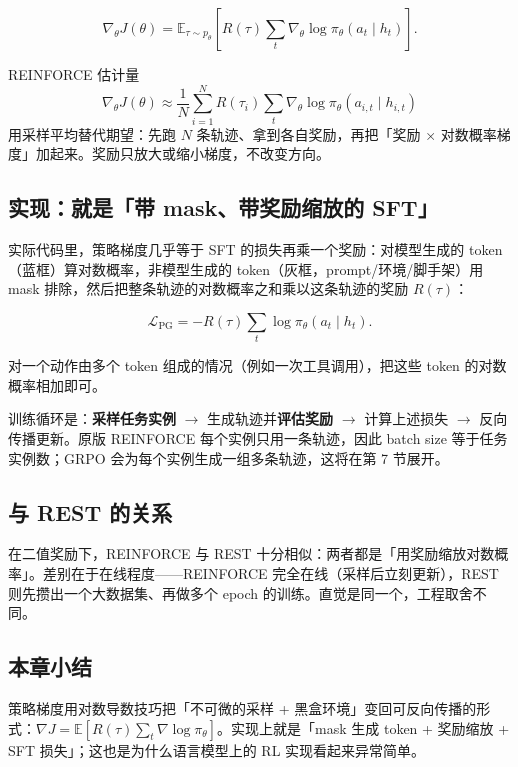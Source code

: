 \documentclass[a4paper]{article}
\begin{document}
$$
\nabla_\theta J(\theta) = \mathbb{E}_{\tau \sim p_\theta}\left[ R(\tau) \sum_{t} \nabla_\theta \log \pi_\theta(a_t \mid h_t) \right].
$$

\begin{importantbox}{REINFORCE 估计量}
\begin{displaymath}
\nabla_\theta J(\theta) \approx \frac{1}{N}\sum_{i=1}^{N} R(\tau_i) \sum_{t} \nabla_\theta \log \pi_\theta(a_{i,t} \mid h_{i,t})
\end{displaymath}
用采样平均替代期望：先跑 $N$ 条轨迹、拿到各自奖励，再把「奖励 × 对数概率梯度」加起来。奖励只放大或缩小梯度，不改变方向。
\end{importantbox}

\subsection{实现：就是「带 mask、带奖励缩放的 SFT」}

实际代码里，策略梯度几乎等于 SFT 的损失再乘一个奖励：对模型生成的 token（蓝框）算对数概率，非模型生成的 token（灰框，prompt/环境/脚手架）用 mask 排除，然后把整条轨迹的对数概率之和乘以这条轨迹的奖励 $R(\tau)$：

$$
\mathcal{L}_{\text{PG}} = -R(\tau) \sum_{t} \log \pi_\theta(a_t \mid h_t).
$$

对一个动作由多个 token 组成的情况（例如一次工具调用），把这些 token 的对数概率相加即可。

训练循环是：\textbf{采样任务实例} $\rightarrow$ 生成轨迹并\textbf{评估奖励} $\rightarrow$ 计算上述损失 $\rightarrow$ 反向传播更新。原版 REINFORCE 每个实例只用一条轨迹，因此 batch size 等于任务实例数；GRPO 会为每个实例生成一组多条轨迹，这将在第 7 节展开。

\subsection{与 REST 的关系}

在二值奖励下，REINFORCE 与 REST 十分相似：两者都是「用奖励缩放对数概率」。差别在于在线程度——REINFORCE 完全在线（采样后立刻更新），REST 则先攒出一个大数据集、再做多个 epoch 的训练。直觉是同一个，工程取舍不同。

\subsection{本章小结}
策略梯度用对数导数技巧把「不可微的采样 + 黑盒环境」变回可反向传播的形式：$\nabla J = \mathbb{E}[R(\tau)\sum_t \nabla\log\pi_\theta]$。实现上就是「mask 生成 token + 奖励缩放 + SFT 损失」；这也是为什么语言模型上的 RL 实现看起来异常简单。
\end{document}
